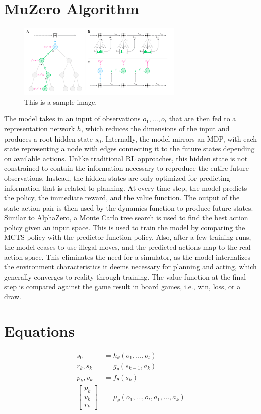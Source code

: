 \documentclass{article}
\begin{document}
\section*{MuZero Algorithm}
\begin{figure}[h!]
    \centering
    \includegraphics[width=0.7\textwidth]{graph_1.png}
    \caption{This is a sample image.}
    \label{fig:(A)The progression of the model through its MDP. (B)MuZero acting as an environment with MCTS as feedback. (C)A diagram of training MuZero's model}
\end{figure}
The model takes in an input of observations $o_1, \ldots, o_t$ that are then fed to a representation network $h$, 
which reduces the dimensions of the input and produces a root hidden state $s_0$. Internally, the model 
mirrors an MDP, with each state representing a node with edges connecting it to the future states 
depending on available actions. Unlike traditional RL approaches, this hidden state is not constrained to
contain the information necessary to reproduce the entire future observations. Instead, the hidden states 
are only optimized for predicting information that is related to planning. At every time step, the model 
predicts the policy, the immediate reward, and the value function. The output of the state-action pair is 
then used by the dynamics function to produce future states. Similar to AlphaZero, a Monte Carlo tree 
search is used to find the best action policy given an input space. This is used to train the model by 
comparing the MCTS policy with the predictor function policy. Also, after a few training runs, the model 
ceases to use illegal moves, and the predicted actions map to the real action space. This eliminates the 
need for a simulator, as the model internalizes the environment characteristics it deems necessary for
planning and acting, which generally converges to reality through training. The value function at 
the final step is compared against the game result in board games, i.e., win, loss, or a draw.

\section*{Equations}
\begin{align}
    s_0 &= h_\theta(o_1, \ldots, o_t) \\
    r_k, s_k &= g_\theta(s_{k-1}, a_k) \\
    p_k, v_k &= f_\theta(s_k) \\
    \begin{bmatrix}
        p_k \\ v_k \\ r_k
    \end{bmatrix} 
    &= \mu_\theta(o_1, \ldots, o_t, a_1, \ldots, a_k)
\end{align}
\end{document}
